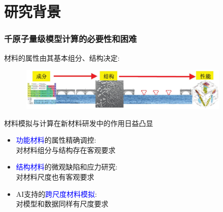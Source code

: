 \small
\section{研究背景}
\begin{frame}
	\frametitle{千原子量级模型计算的必要性和困难}
	材料的属性由其基本组分、结构决定:
\begin{figure}[h!]
\vspace*{-0.10in}
\includegraphics[height=0.80in,width=4.05in]{Figures/MGE-2.png}
\label{Multi-Scale-1}
\end{figure}
	材料模拟与计算在新材料研发中的作用日益凸显
	\begin{itemize}
		\item \textcolor{blue}{功能材料}的属性精确调控:\\
			对材料组分与结构存在客观要求
		\item \textcolor{blue}{结构材料}的微观缺陷和应力研究:\\
			对材料尺度也有客观要求
		\item \textrm{AI}支持的\textcolor{blue}{跨尺度材料模拟}:\\
			对模型和数据同样有尺度要求
	\end{itemize}
\end{frame}

